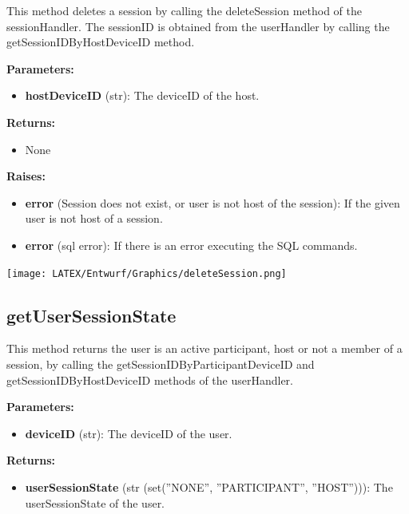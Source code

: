 \documentclass[oneside, ngerman]{sdqtechreport}
\begin{document}
This method deletes a session by calling the deleteSession method of the sessionHandler. The sessionID is obtained from the userHandler by calling the getSessionIDByHostDeviceID method.

\textbf{Parameters:}

\begin{itemize}
    \item \textbf{hostDeviceID} (str): The deviceID of the host.
\end{itemize}

\textbf{Returns:}

\begin{itemize}
    \item None
\end{itemize}

\textbf{Raises:}

\begin{itemize}
    \item \textbf{error} (Session does not exist, or user is not host of the session): If the given user is not host of a session.
    \item \textbf{error} (sql error): If there is an error executing the SQL commands.
\end{itemize}

\begin{center}
   \texttt{[image: LATEX/Entwurf/Graphics/deleteSession.png]} 
\end{center}




\subsection*{getUserSessionState}

This method returns the user is an active participant, host or not a member of a session, by calling the getSessionIDByParticipantDeviceID and getSessionIDByHostDeviceID methods of the userHandler.

\textbf{Parameters:}

\begin{itemize}
    \item \textbf{deviceID} (str): The deviceID of the user.
\end{itemize}

\textbf{Returns:}

\begin{itemize}
    \item \textbf{userSessionState} (str (set(''NONE'', ''PARTICIPANT'', ''HOST''))): The userSessionState of the user.
\end{itemize}
\end{document}
